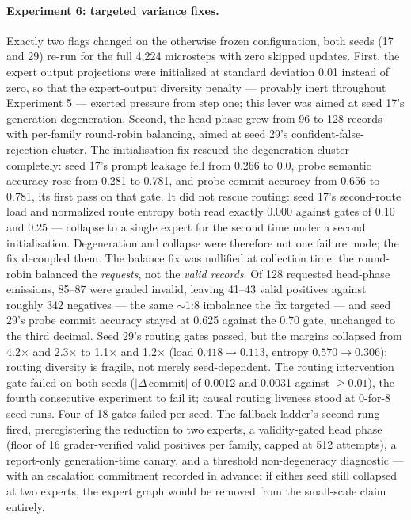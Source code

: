 \documentclass[10pt,a4paper]{article}
\begin{document}
\paragraph{Experiment 6: targeted variance fixes.}
Exactly two flags changed on the otherwise frozen configuration, both seeds (17 and 29) re-run for the full 4{,}224 microsteps with zero skipped updates. First, the expert output projections were initialised at standard deviation 0.01 instead of zero, so that the expert-output diversity penalty --- provably inert throughout Experiment 5 --- exerted pressure from step one; this lever was aimed at seed 17's generation degeneration. Second, the head phase grew from 96 to 128 records with per-family round-robin balancing, aimed at seed 29's confident-false-rejection cluster. The initialisation fix rescued the degeneration cluster completely: seed 17's prompt leakage fell from 0.266 to 0.0, probe semantic accuracy rose from 0.281 to 0.781, and probe commit accuracy from 0.656 to 0.781, its first pass on that gate. It did not rescue routing: seed 17's second-route load and normalized route entropy both read exactly 0.000 against gates of 0.10 and 0.25 --- collapse to a single expert for the second time under a second initialisation. Degeneration and collapse were therefore not one failure mode; the fix decoupled them. The balance fix was nullified at collection time: the round-robin balanced the \emph{requests}, not the \emph{valid records}. Of 128 requested head-phase emissions, 85--87 were graded invalid, leaving 41--43 valid positives against roughly 342 negatives --- the same $\sim$1:8 imbalance the fix targeted --- and seed 29's probe commit accuracy stayed at 0.625 against the 0.70 gate, unchanged to the third decimal. Seed 29's routing gates passed, but the margins collapsed from 4.2$\times$ and 2.3$\times$ to 1.1$\times$ and 1.2$\times$ (load $0.418 \to 0.113$, entropy $0.570 \to 0.306$): routing diversity is fragile, not merely seed-dependent. The routing intervention gate failed on both seeds ($\lvert\Delta\,\mathrm{commit}\rvert$ of 0.0012 and 0.0031 against $\geq 0.01$), the fourth consecutive experiment to fail it; causal routing liveness stood at 0-for-8 seed-runs. Four of 18 gates failed per seed. The fallback ladder's second rung fired, preregistering the reduction to two experts, a validity-gated head phase (floor of 16 grader-verified valid positives per family, capped at 512 attempts), a report-only generation-time canary, and a threshold non-degeneracy diagnostic --- with an escalation commitment recorded in advance: if either seed still collapsed at two experts, the expert graph would be removed from the small-scale claim entirely.
\end{document}
